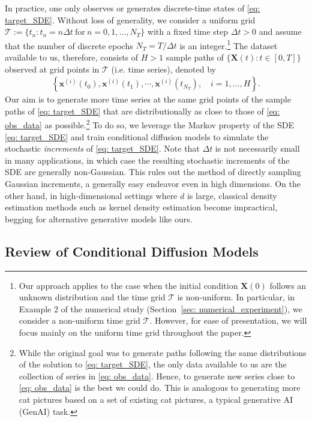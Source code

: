 \documentclass[11pt]{article}
\newcommand{\bX}{\mathbf{X}}
\newcommand{\bx}{\mathbf{x}}
\begin{document}
In practice, one only observes or generates discrete-time states of \eqref{eq: target_SDE}. Without loss of generality, we consider a uniform grid $\mathcal{T} := \{t_n: t_n = n\Delta t\ \text{for}\ n=0, 1, ..., N_T\}$ with a fixed time step $\Delta t > 0$ and assume that the number of discrete epochs $N_T = T / \Delta t$ is an integer.\footnote{Our approach applies to the case  when the initial condition $\bX(0)$ follows an unknown distribution and the time grid $\mathcal{T}$ is non-uniform. In particular, in Example 2 of the numerical study (Section~\ref{sec: numerical_experiment}), we consider a non-uniform time grid $\mathcal{T}$. However,  for ease of presentation, we will focus mainly on the uniform time grid throughout the paper.}  The dataset available to us, therefore,  consists of $H > 1$ sample paths of $\{\bX(t): t \in [0, T]\}$ observed at grid points in $\mathcal{T}$ (i.e. time series), denoted by
\begin{align}\label{eq: obs_data}
	\left\{\bx^{(i)}(t_0), \bx^{(i)}(t_1), \cdots, \bx^{(i)}(t_{N_T}),\quad i=1, ..., H\right\}.
\end{align}
Our aim is to generate more time series at the same grid points of the sample paths of \eqref{eq: target_SDE} that are distributionally as close to those of \eqref{eq: obs_data} as possible.\footnote{While the original goal was to generate paths following the same distributions of the solution to \eqref{eq: target_SDE}, the only data available to us are the collection of series in \eqref{eq: obs_data}. Hence, to generate new series close to \eqref{eq: obs_data} is the best we could do. This is analogous to generating more cat pictures based on a set of existing cat pictures, a typical generative AI (GenAI) task.}
 To do so, we leverage the Markov property of the SDE \eqref{eq: target_SDE} and train conditional diffusion models to simulate the stochastic {\it increments} of \eqref{eq: target_SDE}. Note that $\Delta t$ is not necessarily small in many applications, in which case the resulting stochastic increments of the SDE  are generally non-Gaussian. This rules out the method of directly sampling Gaussian increments, a generally easy endeavor even in high dimensions. On the other hand, in high-dimensional settings where $d$ is large, classical density estimation methods such as kernel density estimation become impractical, begging for alternative generative models like ours.





\subsection{Review of Conditional Diffusion Models}\label{sec:CDM-review}
\end{document}
